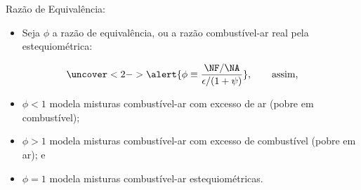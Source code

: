     \begin{frame}{Razão de Equivalência:}\vspace*{-2em}
        \begin{itemize}
            \item<1-> Seja \alert{$\phi$} a razão de equivalência, ou a razão combustível-ar
                \alert{real pela estequiométrica}:
        \end{itemize}
        \vspace*{0.8em}\begin{equation*}
            \uncover<2->{
                \alert{\phi \equiv \frac{\NF/\NA}{\epsilon / (1 + \psi)}},\qquad\mbox{assim,}
            }
        \end{equation*}
        \vspace*{-0.8em}\begin{itemize}
            \item<3-> \alert{$\phi < 1$} modela misturas combustível-ar com
                \alert{excesso de ar} (pobre em combustível);
                \\[\bigskipamount]
            \item<4-> \alert{$\phi > 1$} modela misturas combustível-ar com
                \alert{excesso de combustível} (pobre em ar); e
                \\[\bigskipamount]
            \item<5-> \alert{$\phi = 1$} modela misturas combustível-ar
                \alert{estequiométricas}.
        \end{itemize}
    \end{frame}

